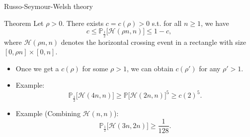 \documentclass{beamer}
\begin{document}
\begin{frame}{Russo-Seymour-Welsh theory}
    \begin{block}{Theorem}
    Let $\rho>0$. There exists $c=c(\rho)>0$ s.t. for all $n\geq 1$, we have
    $$
    c\leq\mathbb{P}_{\frac{1}{2}}\big[\mathcal{H}(\rho n, n)\big]\leq 1-c,
    $$
    where $\mathcal{H}(\rho n, n)$ denotes the horizontal crossing event in a rectangle with size $[0,\rho n]\times [0,n]$.
    \end{block}
    \begin{itemize}
        \item Once we get a $c(\rho)$ for some $\rho>1$, we can obtain $c(\rho')$ for any $\rho'>1$.
        \item Example:
        \begin{equation*}
            \mathbb{P}_\frac{1}{2}\big[\mathcal{H}(4n,n)\big]\geq\mathbb{P}\big[\mathcal{H}(2n,n)\big]^5\geq c(2)^5.
        \end{equation*}
        \item Example (Combining $\mathcal{H}(n,n)$):
        \begin{equation*}
            \mathbb{P}_\frac{1}{2}\big[\mathcal{H}(3n,2n)\big]\geq\frac{1}{128}.
        \end{equation*}
    \end{itemize}
\end{frame}
\end{document}
